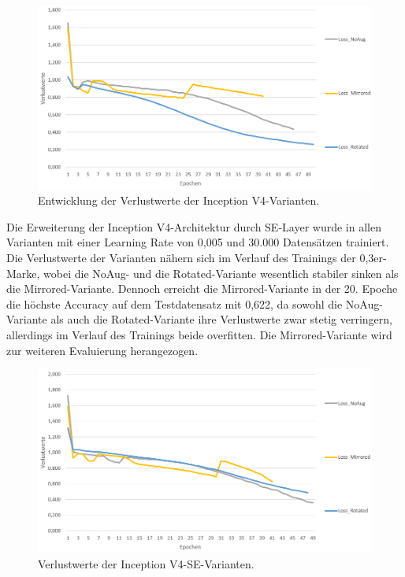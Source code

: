 \begin{figure}[ht]
\centering
\includegraphics[scale=0.5]{pictures/Auswertung/incv4_loss}
\caption{Entwicklung der Verlustwerte der Inception V4-Varianten.}
\label{fig:loss_incv4}
\end{figure}
 
Die Erweiterung der Inception V4-Architektur durch SE-Layer wurde in allen Varianten mit einer Learning Rate von 0,005 und 30.000 Datensätzen trainiert. Die Verlustwerte der Varianten nähern sich im Verlauf des Trainings der 0,3er-Marke, wobei die NoAug- und die Rotated-Variante wesentlich stabiler sinken als die Mirrored-Variante. Dennoch erreicht die Mirrored-Variante in der 20. Epoche die höchste Accuracy auf dem Testdatensatz mit 0,622, da sowohl die NoAug-Variante als auch die Rotated-Variante ihre Verlustwerte zwar stetig verringern, allerdings im Verlauf des Trainings beide overfitten. Die Mirrored-Variante wird zur weiteren Evaluierung herangezogen. 

\begin{figure}[H]
\centering
\includegraphics[scale=0.5]{pictures/Auswertung/incv4se_loss}
\caption{Verlustwerte der Inception V4-SE-Varianten.}
\label{fig:loss_incv4se}
\end{figure}


